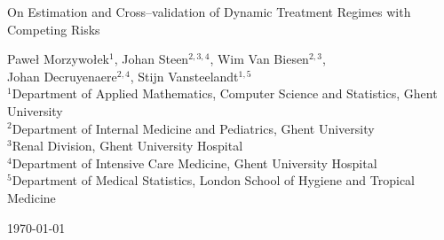 \documentclass[12pt]{article}
\begin{document}
\newcommand{\cip}{\perp\!\!\!\!\perp}
\newcommand{\nothere}[1]{}
\newcommand{\noi}{\noindent}
\newcommand{\mbf}[1]{\mbox{\boldmath $#1$}}
\newcommand{\cond}{\, |\,}
\newcommand{\hO}[2]{{\cal O}_{#1}^{#2}}
\newcommand{\hF}[2]{{\cal F}_{#1}^{#2}}
\newcommand{\tl}[1]{\tilde{\lambda}_{#1}^T}
\newcommand{\la}[2]{\lambda_{#1}^T(Z^{#2})}
\newcommand{\I}[1]{1_{(#1)}}
\newcommand{\cd}{\mbox{$\stackrel{\mbox{\tiny{\cal D}}}{\rightarrow}$}}
\newcommand{\cp}{\mbox{$\stackrel{\mbox{\tiny{p}}}{\rightarrow}$}}
\newcommand{\cas}{\mbox{$\stackrel{\mbox{\tiny{a.s.}}}{\rightarrow}$}}
\newcommand{\ld}{\mbox{$\; \stackrel{\mbox{\tiny{def}}}{=3D} \; $}}
\newcommand{\nk}{\mbox{$n \rightarrow \infty$}}
\newcommand{\con}{\mbox{$\rightarrow $}}
\newcommand{\dprime}{\mbox{$\prime \vspace{-1 mm} \prime$}}
\newcommand{\Borel}{\mbox{${\cal B}$}}
\newcommand{\bevis}{\mbox{$\underline{\em{Proof}}$}}
\newcommand{\Rd}[1]{\mbox{${\Re^{#1}}$}}
\newcommand{\il}[1]{{\int_{0}^{#1}}}
\newcommand{\pl}[1]{\mbox{\bf {\LARGE #1}}}
\newcommand{\expit}{\text{expit}}
\newcommand{\indep}{\rotatebox[origin=c]{90}{$\models$}}
\newcommand{\blind}{1}
\newcommand{\pr}{\text{pr}}
\newcommand{\var}{\text{var}}
\newcommand{\cov}{\text{cov}}
\newcommand{\Bin}{\text{Bin}}
\newcommand{\Exp}{\text{Exp}}
\newcommand{\unif}{\text{unif}}
\newcommand{\logit}{\text{logit}}
\newcommand{\sign}{\text{sign}}
\newcommand{\support}{\text{support}}
\newcommand\norm[1]{\left\lVert#1\right\rVert}

\newtheorem{theorem}{Theorem}
\newtheorem{lemma}{Lemma}
\newtheorem{prop}{Proposition}
\newtheorem{assumption}{Assumption}
\newtheorem{definition}{Definition}
\newtheorem*{remark}{Remark}
\newtheorem{corollary}{Corollary}
\newtheorem{example}{Example}

\parindent12pt

\begin{center}{\Large{On Estimation and Cross--validation of Dynamic Treatment Regimes with Competing Risks}}
 \end{center}
 
 { 
\begin{center}
Pawe\l{} Morzywo\l{}ek$^{1}$, Johan Steen$^{2,3,4}$, Wim Van Biesen$^{2,3}$, \\
Johan Decruyenaere$^{2,4}$, Stijn Vansteelandt$^{1,5}$\\
\bigskip
\scriptsize{$^1$Department of Applied Mathematics, Computer Science and Statistics, Ghent University} \\
\scriptsize{$^2$Department of Internal Medicine and Pediatrics, Ghent University} \\
\scriptsize{$^3$Renal Division, Ghent University Hospital} \\
\scriptsize{$^4$Department of Intensive Care Medicine, Ghent University Hospital} \\
\scriptsize{$^5$Department of Medical Statistics, London School of Hygiene and Tropical Medicine}
\end{center}
}
\smallskip
\begin{center}
\today
\end{center}
\smallskip
\end{document}
